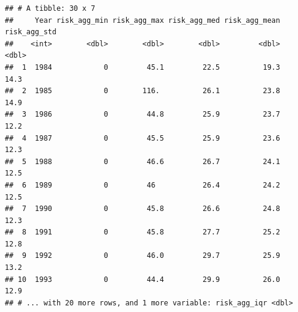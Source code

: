 \documentclass[12pt,]{article}
\newenvironment{Shaded}{\begin{snugshade}}{\end{snugshade}}
\newcommand{\KeywordTok}[1]{\textcolor[rgb]{0.13,0.29,0.53}{\textbf{#1}}}
\newcommand{\DataTypeTok}[1]{\textcolor[rgb]{0.13,0.29,0.53}{#1}}
\newcommand{\StringTok}[1]{\textcolor[rgb]{0.31,0.60,0.02}{#1}}
\newcommand{\OperatorTok}[1]{\textcolor[rgb]{0.81,0.36,0.00}{\textbf{#1}}}
\newcommand{\NormalTok}[1]{#1}
\begin{document}
\begin{Shaded}
\end{Shaded}

\begin{verbatim}
## # A tibble: 30 x 7
##     Year risk_agg_min risk_agg_max risk_agg_med risk_agg_mean risk_agg_std
##    <int>        <dbl>        <dbl>        <dbl>         <dbl>        <dbl>
##  1  1984            0         45.1         22.5          19.3         14.3
##  2  1985            0        116.          26.1          23.8         14.9
##  3  1986            0         44.8         25.9          23.7         12.2
##  4  1987            0         45.5         25.9          23.6         12.3
##  5  1988            0         46.6         26.7          24.1         12.5
##  6  1989            0         46           26.4          24.2         12.5
##  7  1990            0         45.8         26.6          24.8         12.3
##  8  1991            0         45.8         27.7          25.2         12.8
##  9  1992            0         46.0         29.7          25.9         13.2
## 10  1993            0         44.4         29.9          26.0         12.9
## # ... with 20 more rows, and 1 more variable: risk_agg_iqr <dbl>
\end{verbatim}
\end{document}

